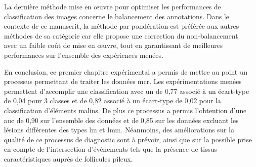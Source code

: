 La dernière méthode mise en œuvre pour optimiser les performances de classification des images concerne le balancement des annotations. Dans le contexte de ce manuscrit, la méthode par pondération est préférée aux autres méthodes de sa catégorie car elle propose une correction du non-balancement avec un faible coût de mise en œuvre, tout en garantissant de meilleures performances sur l'ensemble des expériences menées.\par

En conclusion, ce premier chapitre expérimental a permis de mettre au point un processus permettant de traiter les données \gls{mcr}. Les expérimentations menées permettent d'accomplir une classification avec un \fscore{} de 0,77 associé à un écart-type de 0,04 pour 3 classes et de 0,82 associé à un écart-type de 0,02 pour la classification d'éléments malins. De plus ce processus a permis l'obtention d'une \gls{auc} de 0,90 sur l'ensemble des données et de 0,85 sur les données excluant les lésions différentes des types \gls{lm} et \gls{lmm}. Néanmoins, des améliorations sur la qualité de ce processus de diagnostic sont à prévoir, ainsi que sur la possible prise en compte de l'intersection d'évènements tels que la présence de tissus caractéristiques auprès de follicules pileux.\par